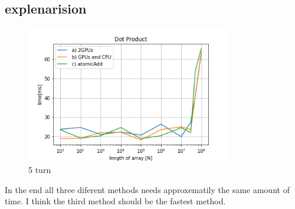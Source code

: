 \documentclass[11pt,a4paper]{article}
\begin{document}
\subsection{explenarision}
\begin{figure}[H]
	\centering
	\includegraphics[width=0.80\textwidth]{Bilder/Dot_Prod.png}
	\caption{5 turn}
\end{figure}
In the end all three diferent methods needs approxematily the same amount of time. I think the third method should be the fastest method.
\end{document}
